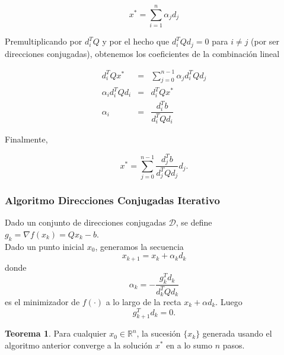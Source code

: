 \documentclass[11pt,letterpaper]{article}
\theoremstyle{definition}
\theoremstyle{definition}
\newtheorem{teo}{Teorema}[section]%
\theoremstyle{definition}
\begin{document}
\begin{shaded*}
	\begin{equation*}
		x^* = \sum_{i = 1}^n \alpha_j d_j
	\end{equation*}
\end{shaded*}
Premultiplicando por $ d_i^T Q $ y por el hecho que $ d_i^T Q d_j = 0 $ para $ i \neq j $ (por ser direcciones conjugadas), obtenemos los coeficientes de la combinación lineal
\begin{shaded*}
	\begin{eqnarray*}
		d_i^T Q x^* & = & \sum_{j = 0}^{n-1} \alpha_j d_i^T Q d_j \\
		\alpha_i d_i^T Q d_i & = & d_i^T Q x^* \\
		\alpha_i & = & \dfrac{d_i^T b}{d_i^T Q d_i}
	\end{eqnarray*}
\end{shaded*}
Finalmente, 
\begin{shaded*}
	\begin{equation*}
		x^* = \sum_{j = 0}^{n-1} \dfrac{d_j^T b}{d_j^T Q d_j} d_j.
	\end{equation*}
\end{shaded*}
\subsubsection{Algoritmo Direcciones Conjugadas Iterativo}
Dado un conjunto de direcciones conjugadas $ \mathcal{D} $, se define $ g_k = \nabla f(x_k) = Q x_k - b $. 
\\
Dado un punto inicial $ x_0 $, generamos la secuencia
\[ x_{k+1} = x_k + \alpha_k d_k \]
donde
\[ \alpha_k = - \dfrac{g_k^T d_k}{d_k^T Q d_k} \]
es el minimizador de $ f(\cdot) $ a lo largo de la recta $ x_k + \alpha d_k $. Luego
\[ g_{k+1}^T d_k = 0. \]
\begin{shaded*}
	\begin{teo}
		Para cualquier $ x_0 \in \mathbb{R}^n $, la sucesión $ \{ x_k \} $ generada usando el algoritmo anterior converge a la solución $ x^* $ en a lo sumo $ n $ pasos.
	\end{teo}
\end{shaded*}
\end{document}
